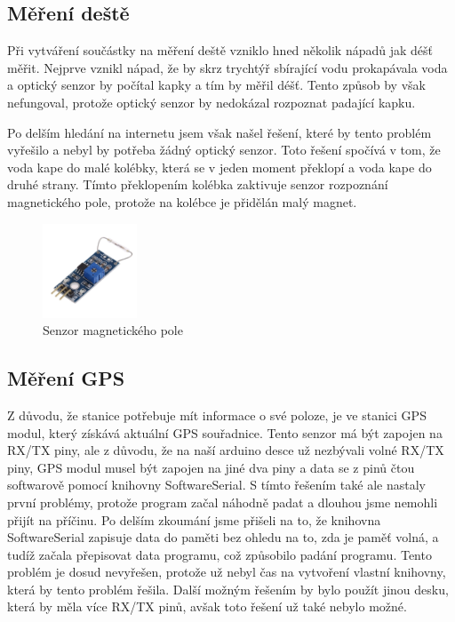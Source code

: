 \subsection{Měření deště}
Při vytváření součástky na měření deště vzniklo hned několik nápadů jak déšť měřit. Nejprve vznikl nápad,
že by skrz trychtýř sbírající vodu prokapávala voda a optický senzor by počítal kapky a tím by měřil déšť.
Tento způsob by však nefungoval, protože optický senzor by nedokázal rozpoznat padající kapku.

Po delším hledání na internetu jsem však našel řešení\cite{mereni_deste}, které by tento problém vyřešilo a nebyl by potřeba žádný optický senzor. Toto řešení spočívá v tom, že voda kape do malé kolébky, která se v jeden moment překlopí a voda kape do druhé strany.
Tímto překlopením kolébka zaktivuje senzor rozpoznání magnetického pole, protože na kolébce je přidělán malý magnet.

\begin{figure}[h] 
    \centering
    \includegraphics[width=0.25\textwidth]{images/magnet_sensor.jpg}
    \caption{Senzor magnetického pole}
\end{figure}

\subsection{Měření GPS}
Z důvodu, že stanice potřebuje mít informace o své poloze, je ve stanici GPS modul, který získává aktuální GPS souřadnice.
Tento senzor má být zapojen na RX/TX piny, ale z důvodu, že na naší arduino desce už
nezbývali volné RX/TX piny, GPS modul musel být zapojen na jiné dva piny a data se z pinů čtou softwarově pomocí knihovny SoftwareSerial.
S tímto řešením také ale nastaly první problémy, protože program začal náhodně padat a dlouhou jsme nemohli přijít na příčinu.
Po delším zkoumání jsme přišeli na to, že knihovna SoftwareSerial zapisuje data do paměti bez ohledu na to, zda je paměť volná,
a tudíž začala přepisovat data programu, což způsobilo padání programu.
Tento problém je dosud nevyřešen, protože už nebyl čas na vytvoření vlastní knihovny, která by tento problém řešila.
Další možným řešením by bylo použít jinou desku, která by měla více RX/TX pinů, avšak toto řešení už také nebylo možné.

